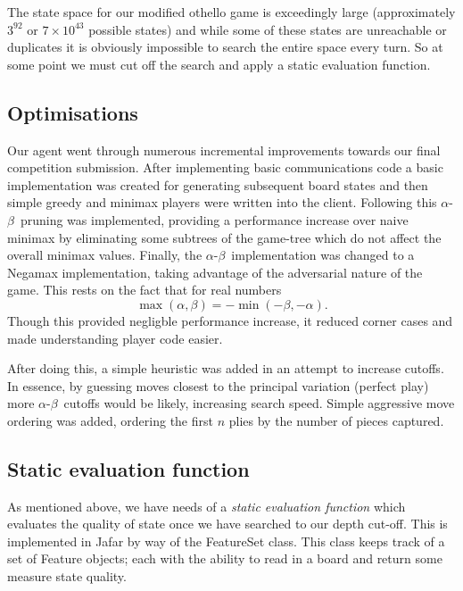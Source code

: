 \documentclass[11pt]{article}
\newcommand{\ab}{$\alpha$-$\beta$}
\begin{document}
The state space for our modified othello game is exceedingly large
(approximately $3^{92}$ or $7 \times 10^{43}$ possible states) and while some
of these states are unreachable or duplicates it is obviously impossible to
search the entire space every turn. So at some point we must cut off the
search and apply a static evaluation function.

\subsection{Optimisations}
\label{sub:optimisations}
Our agent went through numerous incremental improvements towards our final
competition submission. After implementing basic communications code a basic
implementation was created for generating subsequent board states and then
simple greedy and minimax players were written into the client. Following
this \ab\ pruning was implemented, providing a performance increase over
naive minimax by eliminating some subtrees of the game-tree which do not
affect the overall minimax values.
Finally, the \ab\ implementation was
changed to a Negamax implementation, taking advantage of the adversarial
nature of the game. This rests on the fact that for real numbers
\[
  \max(\alpha, \beta) = -\min(-\beta, -\alpha).
\]
Though this provided negligble performance increase, it
reduced corner cases and made understanding player code easier.

After doing this, a simple heuristic was added in an attempt to increase
cutoffs. In essence, by guessing moves closest to the principal variation
(perfect play) more \ab\ cutoffs would be likely, increasing search speed.
Simple aggressive move ordering was added, ordering the first $n$ plies by the
number of pieces captured.

\subsection{Static evaluation function}
\label{sub:eval_func}
As mentioned above, we have needs of a \emph{static evaluation function} which
evaluates the quality of state once we have searched to our depth cut-off.
This is implemented in Jafar by way of the FeatureSet class. This class keeps
track of a set of Feature objects; each with the ability to read in a board and
return some measure state quality.
\end{document}
